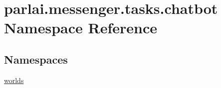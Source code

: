 \hypertarget{namespaceparlai_1_1messenger_1_1tasks_1_1chatbot}{}\section{parlai.\+messenger.\+tasks.\+chatbot Namespace Reference}
\label{namespaceparlai_1_1messenger_1_1tasks_1_1chatbot}
\subsection*{Namespaces}
\begin{DoxyCompactItemize}
\item 
 \hyperlink{namespaceparlai_1_1messenger_1_1tasks_1_1chatbot_1_1worlds}{worlds}
\end{DoxyCompactItemize}
